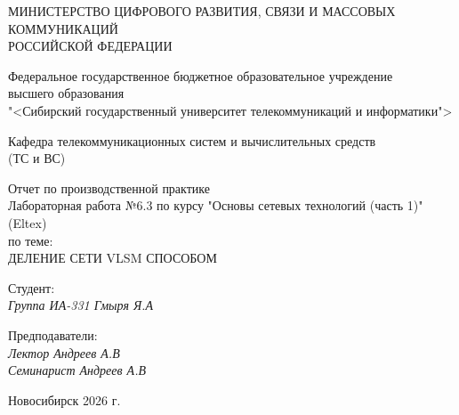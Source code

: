 \thispagestyle{empty}

\begin{center}
    МИНИСТЕРСТВО ЦИФРОВОГО РАЗВИТИЯ, СВЯЗИ И МАССОВЫХ КОММУНИКАЦИЙ \\ РОССИЙСКОЙ ФЕДЕРАЦИИ

    \vspace{20pt}

    Федеральное государственное бюджетное образовательное учреждение  \\  высшего образования \\
    "<Сибирский государственный университет телекоммуникаций и информатики"> \\

    \vspace{20pt}

    Кафедра телекоммуникационных систем и вычислительных средств \\  (ТС и ВС)
\end{center}

\vfill

\begin{center}
    Отчет по производственной практике \\  
    Лабораторная работа №6.3 по курсу "Основы сетевых технологий (часть 1)" (Eltex) \\
    \vspace{20pt}
    по теме: \\
    \uppercase{Деление сети VLSM способом}
\end{center}

\vfill

    \noindent Студент: \\
    \textit{Группа ИА-331 \hfill Гмыря Я.А} 

    \vspace{20pt}
 
    \noindent Предподаватели: \\
    \textit{Лектор \hfill Андреев А.В} \\
    \textit{Семинарист \hfill Андреев А.В}

\vfill

\begin{center}
    Новосибирск 2026 г.
\end{center}